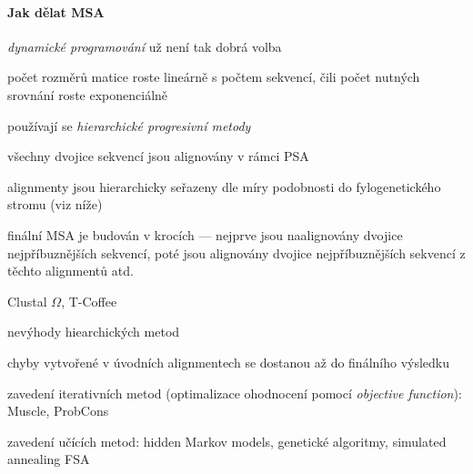 \documentclass[DIV=8]{scrreprt}
\begin{document}
\paragraph{Jak dělat MSA}
\begin{myItemize}[nosep]
    \item \emph{dynamické programování} už není tak dobrá volba
\begin{myItemize}[nosep]
    \item počet rozměrů matice roste lineárně s počtem sekvencí, čili počet nutných srovnání roste exponenciálně
\end{myItemize}

    \item používají se \emph{hierarchické progresivní metody}
\begin{myItemize}[nosep]
    \item všechny dvojice sekvencí jsou alignovány v rámci PSA
    \item alignmenty jsou hierarchicky seřazeny dle míry podobnosti do fylogenetického stromu (viz níže)
    \item finální MSA je budován v krocích --- nejprve jsou naalignovány dvojice nejpříbuznějších sekvencí, poté jsou alignovány dvojice nejpříbuznějších sekvencí z těchto alignmentů atd.
    \item Clustal \(\Omega\), T-Coffee
\end{myItemize}

    \item nevýhody hiearchických metod
\begin{myItemize}[nosep]
    \item chyby vytvořené v úvodních alignmentech se dostanou až do finálního výsledku
\begin{myItemize}[nosep]
    \item zavedení iterativních metod (optimalizace ohodnocení pomocí \emph{objective function}): Muscle, ProbCons
    \item zavedení učících metod: hidden Markov models, genetické algoritmy, simulated annealing FSA
\end{myItemize}

\end{myItemize}

\end{myItemize}
\end{document}
